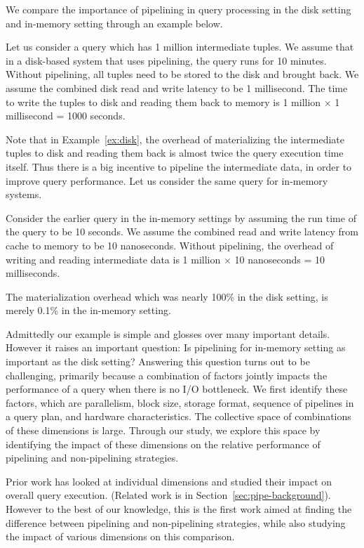 We compare the importance of pipelining in query processing in the disk setting and in-memory setting through an example below.

\begin{example}\label{ex:disk}
	Let us consider a query which has 1 million intermediate tuples.
	We assume that in a disk-based system that uses pipelining, the query runs for 10 minutes. 
	Without pipelining, all tuples need to be stored to the disk and brought back.
	We assume the combined disk read and write latency to be 1 millisecond.
	The time to write the tuples to disk and reading them back to memory is 1 million $\times$ 1 millisecond = 1000 seconds.
\end{example}

Note that in Example~\ref{ex:disk}, the overhead of materializing the intermediate tuples to disk and reading them back is almost twice the query execution time itself. 
Thus there is a big incentive to pipeline the intermediate data, in order to improve query performance. 
Let us consider the same query for in-memory systems.

\begin{example}\label{ex:in-mem}
	Consider the earlier query in the in-memory settings by assuming the run time of the query to be 10 seconds. 
	We assume the combined read and write latency from cache to memory to be 10 nanoseconds.
	Without pipelining, the overhead of writing and reading intermediate data is 1 million $\times$ 10 nanoseconds = 10 milliseconds.
\end{example}

The materialization overhead which was nearly 100\% in the disk setting, is merely 0.1\% in the in-memory setting.

Admittedly our example is simple and glosses over many important details. 
However it raises an important question: Is pipelining for in-memory setting as important as the disk setting? 
Answering this question turns out to be challenging, primarily because a combination of factors jointly impacts the performance of a query when there is no I/O bottleneck. 
We first identify these factors, which are parallelism, block size, storage format, sequence of pipelines in a query plan, and hardware characteristics.
The collective space of combinations of these dimensions is large. 
Through our study, we explore this space by identifying the impact of these dimensions on the relative performance of pipelining and non-pipelining strategies.

Prior work has looked at individual dimensions and studied their impact on overall query execution. (Related work is in Section~\ref{sec:pipe-background}).
However to the best of our knowledge, this is the first work aimed at finding the difference between pipelining and non-pipelining strategies, while also studying the impact of various dimensions on this comparison. 
%

